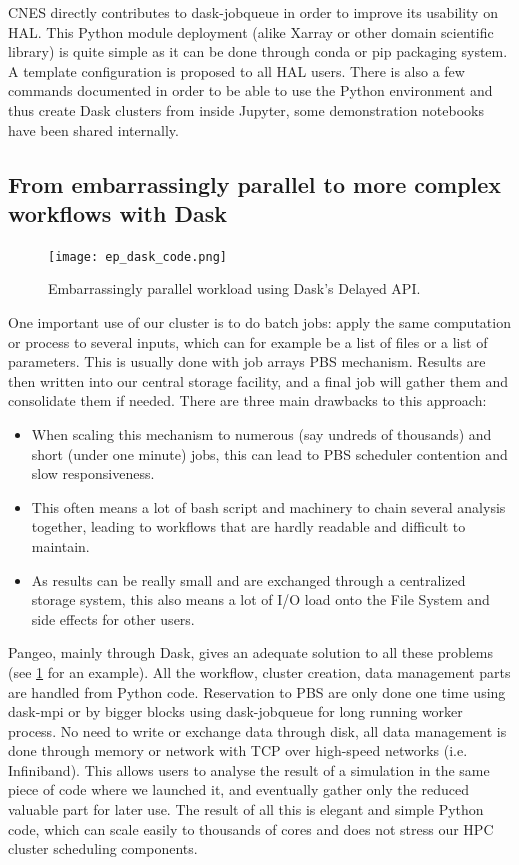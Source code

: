 \documentclass{article}
\begin{document}
CNES directly contributes to dask-jobqueue in order to improve its usability on HAL. This Python module deployment (alike Xarray or other domain scientific library) is quite simple as it can be done through conda or pip packaging system. A template configuration is proposed to all HAL users. There is also a few commands documented in order to be able to use the Python environment and thus create Dask clusters from inside Jupyter, some demonstration notebooks have been shared internally.

\subsection{From embarrassingly parallel to more complex workflows with Dask}
\label{ssec:usecase1}

\begin{figure}
  \centering
  \texttt{[image: ep\_dask\_code.png]}
  \caption{\label{ep_dask_code} Embarrassingly parallel workload using Dask's Delayed API.}
\end{figure}

One important use of our cluster is to do batch jobs: apply the same computation or process to several inputs, which can for example be a list of files or a list of parameters. This is usually done with job arrays PBS mechanism. Results are then written into our central storage facility, and a final job will gather them and consolidate them if needed. There are three main drawbacks to this approach:
\begin{itemize}
\item When scaling this mechanism to numerous (say undreds of thousands) and short (under one minute) jobs, this can lead to PBS scheduler contention and slow responsiveness.
\item This often means a lot of bash script and machinery to chain several analysis together, leading to workflows that are hardly readable and difficult to maintain.
\item As results can be really small and are exchanged through a centralized storage system, this also means a lot of I/O load onto the File System and side effects for other users.
\end{itemize}

Pangeo, mainly through Dask, gives an adequate solution to all these problems (see \ref{ep_dask_code} for an example). All the workflow, cluster creation, data management parts are handled from Python code. Reservation to PBS are only done one time using dask-mpi or by bigger blocks using dask-jobqueue for long running worker process. No need to write or exchange data through disk, all data management is done through memory or network with TCP over high-speed networks (i.e. Infiniband). This allows users to analyse the result of a simulation in the same piece of code where we launched it, and eventually gather only the reduced valuable part for later use. The result of all this is elegant and simple Python code, which can scale easily to thousands of cores and does not stress our HPC cluster scheduling components.
\end{document}
